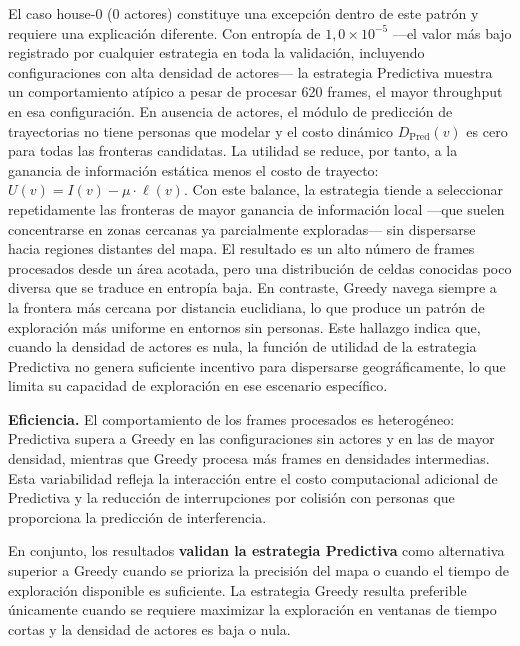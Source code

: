El caso house-0 (0 actores) constituye una excepción dentro de este patrón y requiere una explicación diferente. Con entropía de $1{,}0 \times 10^{-5}$ —el valor más bajo registrado por cualquier estrategia en toda la validación, incluyendo configuraciones con alta densidad de actores— la estrategia Predictiva muestra un comportamiento atípico a pesar de procesar 620 frames, el mayor throughput en esa configuración. En ausencia de actores, el módulo de predicción de trayectorias no tiene personas que modelar y el costo dinámico $D_{\text{Pred}}(v)$ es cero para todas las fronteras candidatas. La utilidad se reduce, por tanto, a la ganancia de información estática menos el costo de trayecto: $U(v) = I(v) - \mu \cdot \ell(v)$. Con este balance, la estrategia tiende a seleccionar repetidamente las fronteras de mayor ganancia de información local —que suelen concentrarse en zonas cercanas ya parcialmente exploradas— sin dispersarse hacia regiones distantes del mapa. El resultado es un alto número de frames procesados desde un área acotada, pero una distribución de celdas conocidas poco diversa que se traduce en entropía baja. En contraste, Greedy navega siempre a la frontera más cercana por distancia euclidiana, lo que produce un patrón de exploración más uniforme en entornos sin personas. Este hallazgo indica que, cuando la densidad de actores es nula, la función de utilidad de la estrategia Predictiva no genera suficiente incentivo para dispersarse geográficamente, lo que limita su capacidad de exploración en ese escenario específico.

\textbf{Eficiencia.} El comportamiento de los frames procesados es heterogéneo: Predictiva supera a Greedy en las configuraciones sin actores y en las de mayor densidad, mientras que Greedy procesa más frames en densidades intermedias. Esta variabilidad refleja la interacción entre el costo computacional adicional de Predictiva y la reducción de interrupciones por colisión con personas que proporciona la predicción de interferencia.

En conjunto, los resultados \textbf{validan la estrategia Predictiva} como alternativa superior a Greedy cuando se prioriza la precisión del mapa o cuando el tiempo de exploración disponible es suficiente. La estrategia Greedy resulta preferible únicamente cuando se requiere maximizar la exploración en ventanas de tiempo cortas y la densidad de actores es baja o nula.
